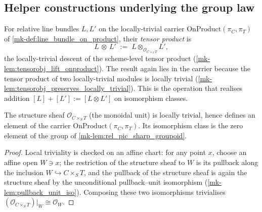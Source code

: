 \subsection{Helper constructions underlying the group law}
\label{mk-subsec:relpic_group_helpers}


\begin{definition}\label{mk-def:rel_tensor_obj}
  \leanok

  For relative line bundles \(L, L'\) on the locally-trivial carrier
  \(\mathrm{OnProduct}(\pi_C, \pi_T)\) of \ref{mk-def:line_bundle_on_product},
  their \emph{tensor product} is
  \[
    L \,\mathbin{\otimes}\, L' \;:=\;
      L \otimes_{\mathcal{O}_{C \times_S T}} L',
  \]
  the locally-trivial descent of the scheme-level tensor product
  (\ref{mk-lem:tensorobj_lift_onproduct}). The result again lies in the carrier
  because the tensor product of two locally-trivial modules is locally trivial
  (\ref{mk-lem:tensorobj_preserves_locally_trivial}). This is the operation that
  realises addition \([L] + [L'] := [L \otimes L']\) on isomorphism classes.
\end{definition}

\begin{lemma}\label{mk-lem:rel_pic_sharp_unit_loctriv}
  \leanok

  The structure sheaf \(\mathcal{O}_{C \times_S T}\) (the monoidal unit) is
  locally trivial, hence defines an element of the carrier
  \(\mathrm{OnProduct}(\pi_C, \pi_T)\). Its isomorphism class is the zero
  element of the group of \ref{mk-lem:rel_pic_sharp_groupoid}.
\end{lemma}

\begin{proof}
  \leanok
 Local triviality is checked on an affine chart: for
  any point \(x\), choose an affine open \(W \ni x\); the restriction of the
  structure sheaf to \(W\) is its pullback along the inclusion
  \(W \hookrightarrow C \times_S T\), and the pullback of the structure sheaf is
  again the structure sheaf by the unconditional pullback--unit isomorphism
  (\ref{mk-lem:pullback_unit_iso}). Composing these two isomorphisms trivialises
  \((\mathcal{O}_{C \times_S T})|_W \cong \mathcal{O}_W\).
\end{proof}

